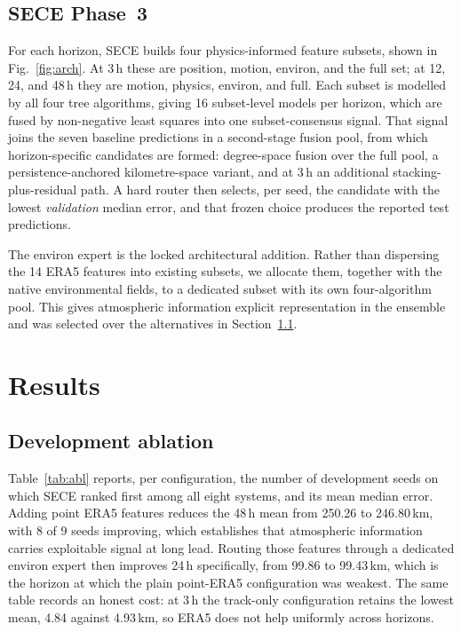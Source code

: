 \documentclass[conference]{IEEEtran}
\newcommand{\sece}{SECE}
\newcommand{\era}{ERA5}
\begin{document}
\subsection{SECE Phase~3}
For each horizon, \sece{} builds four physics-informed feature subsets, shown in
Fig.~\ref{fig:arch}. At 3\,h these are position, motion, environ, and the full
set; at 12, 24, and 48\,h they are motion, physics, environ, and full. Each
subset is modelled by all four tree algorithms, giving 16 subset-level models per
horizon, which are fused by non-negative least squares into one subset-consensus
signal. That signal joins the seven baseline predictions in a second-stage fusion
pool, from which horizon-specific candidates are formed: degree-space fusion over
the full pool, a persistence-anchored kilometre-space variant, and at 3\,h an
additional stacking-plus-residual path. A hard router then selects, per seed, the
candidate with the lowest \emph{validation} median error, and that frozen choice
produces the reported test predictions.

The environ expert is the locked architectural addition. Rather than dispersing
the 14 \era{} features into existing subsets, we allocate them, together with the
native environmental fields, to a dedicated subset with its own four-algorithm
pool. This gives atmospheric information explicit representation in the ensemble
and was selected over the alternatives in Section~\ref{sec:abl}.

\section{Results}
\subsection{Development ablation}
\label{sec:abl}
Table~\ref{tab:abl} reports, per configuration, the number of development seeds
on which \sece{} ranked first among all eight systems, and its mean median error.
Adding point \era{} features reduces the 48\,h mean from 250.26 to 246.80\,km,
with 8 of 9 seeds improving, which establishes that atmospheric information
carries exploitable signal at long lead. Routing those features through a
dedicated environ expert then improves 24\,h specifically, from 99.86 to
99.43\,km, which is the horizon at which the plain point-\era{} configuration was
weakest. The same table records an honest cost: at 3\,h the track-only
configuration retains the lowest mean, 4.84 against 4.93\,km, so \era{} does not
help uniformly across horizons.
\end{document}

